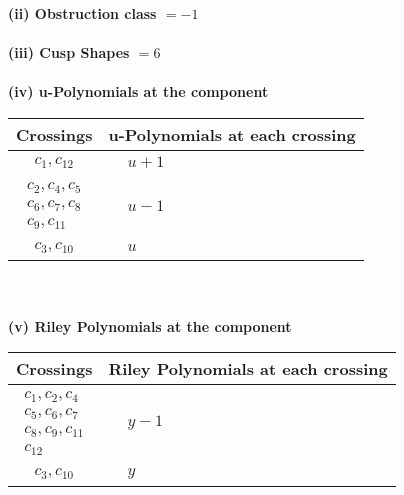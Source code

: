 \documentclass[1p]{elsarticle_modified}
\theoremstyle{definition}
\begin{document}
\flushleft \textbf{(ii) Obstruction class $= -1$}\\~\\
\flushleft \textbf{(iii) Cusp Shapes $= 6$}\\~\\
\newpage\renewcommand{\arraystretch}{1}
\flushleft \textbf{(iv) u-Polynomials at the component}\newline \\
\begin{tabular}{m{50pt}|m{274pt}}
Crossings & \hspace{64pt}u-Polynomials at each crossing \\
\hline $$\begin{aligned}c_{1},c_{12}\end{aligned}$$&$\begin{aligned}
&u+1
\end{aligned}$\\
\hline $$\begin{aligned}c_{2},c_{4},c_{5}\\c_{6},c_{7},c_{8}\\c_{9},c_{11}\end{aligned}$$&$\begin{aligned}
&u-1
\end{aligned}$\\
\hline $$\begin{aligned}c_{3},c_{10}\end{aligned}$$&$\begin{aligned}
&u
\end{aligned}$\\
\hline
\end{tabular}\\~\\
\newpage\renewcommand{\arraystretch}{1}
\flushleft \textbf{(v) Riley Polynomials at the component}\newline \\
\begin{tabular}{m{50pt}|m{274pt}}
Crossings & \hspace{64pt}Riley Polynomials at each crossing \\
\hline $$\begin{aligned}c_{1},c_{2},c_{4}\\c_{5},c_{6},c_{7}\\c_{8},c_{9},c_{11}\\c_{12}\end{aligned}$$&$\begin{aligned}
&y-1
\end{aligned}$\\
\hline $$\begin{aligned}c_{3},c_{10}\end{aligned}$$&$\begin{aligned}
&y
\end{aligned}$\\
\hline
\end{tabular}\\~\\
\end{document}
